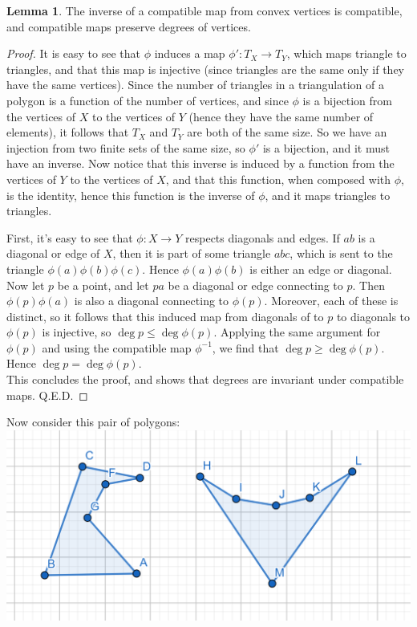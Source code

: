 \documentclass[12pt]{article}
\theoremstyle{definition}
\newtheorem{lemma}{Lemma}
\newcommand{\inv}[1]{#1^{-1}}
\begin{document}
\begin{lemma}
The inverse of a compatible map from convex vertices is compatible, and compatible maps preserve degrees of vertices.
\end{lemma}

\begin{proof}
It is easy to see that $\phi$ induces a map $\phi':T_X\to T_Y$, which maps triangle to triangles, and that this map is injective (since triangles are the same only if they have the same vertices). Since the number of triangles in a triangulation of a polygon is a function of the number of vertices, and since $\phi$ is a bijection from the vertices of $X$ to the vertices of $Y$ (hence they have the same number of elements), it follows that $T_X$ and $T_Y$ are both of the same size. So we have an injection from two finite sets of the same size, so $\phi'$ is a bijection, and it must have an inverse. Now notice that this inverse is induced by a function from the vertices of $Y$ to the vertices of $X$, and that this function, when composed with $\phi$, is the identity, hence this function is the inverse of $\phi$, and it maps triangles to triangles.


First, it's easy to see that $\phi:X \to Y$ respects diagonals and edges. If $ab$ is a diagonal or edge of $X$, then it is part of some triangle $abc$, which is sent to the triangle $\phi(a)\phi(b)\phi(c)$. Hence $\phi(a)\phi(b)$ is either an edge or diagonal. Now let $p$ be a point, and let $pa$ be a diagonal or edge connecting to $p$. Then $\phi(p)\phi(a)$ is also a diagonal connecting to $\phi(p)$. Moreover, each of these is distinct, so it follows that this induced map from diagonals of to $p$ to diagonals to $\phi(p)$ is injective, so $\deg p \le \deg \phi(p)$. Applying the same argument for $\phi(p)$ and using the compatible map $\inv{\phi}$, we find that $\deg p \ge \deg \phi(p)$. Hence $\deg p = \deg{\phi(p)}$.\\

This concludes the proof, and shows that degrees are invariant under compatible maps. Q.E.D.


\end{proof}



Now consider this pair of polygons: \\

\includegraphics[scale=0.5]{counterexample.png} 
\end{document}
